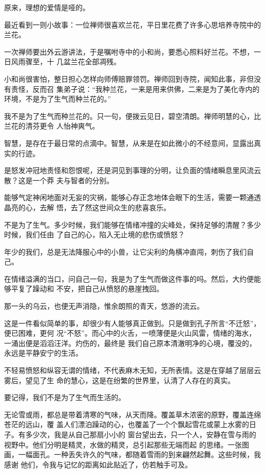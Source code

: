 		\vspace{1em}
		原来，理想的爱情是哑的。

	\endwriting



		最近看到一则小故事：一位禅师很喜欢兰花，平日里花费了许多心思培养寺院中的兰花。

		一次禅师要出外云游讲法，于是嘱咐寺中的小和尚，要悉心照料好兰花。不想，一日风雨骤至，十
	几盆兰花全部凋残。

		小和尚很害怕，整日担心怎样向师傅赔罪领罚。禅师回到寺院，闻知此事，非但没有责怪，反而召
	集弟子说：“我种兰花，一来是用来供佛，二来是为了美化寺内的环境，不是为了生气而种兰花的。”

		我不是为了生气而种兰花的。只一句，便拨云见日，碧空清朗。禅师明慧的心，比兰花的清芬更令
	人怡神爽气。

		智慧，是存在于最日常的点滴中。智慧，从来是在如此微小的不经意间，显露出真实的行迹。

		是怒发冲冠地责怪和怨恨呢，还是洞见到事理的分明，让负面的情绪瞬息里风流云散？这是一个莽
	夫与智者的分别。

		能够气定神闲地面对无妄的灾祸，能够心存正念地体会眼下的生活，需要一颗通透晶亮的心，去解
	悟，去了然这世间众生的悲喜哀乐。

		不是为了生气。多少时候，我们能够在情绪冲撞的尖峰处，保持足够的清醒？多少时候，我们任由
	了自己的心，陷入无止境的悲伤或愤怒？

		年少的我们，总是无法降服心中的小兽，让它尖利的角横冲直闯，刺伤了我们自己。

		在情绪溢满的当口，问自己一句，我是为了生气而做这件事的吗。然后，大约便能够平复了躁动和
	不安，把自己从愤怒的悬崖拽回。

		那一头的乌云，也便无声消隐，惟余朗照的青天，悠游的流云。

		这是一件看似简单的事，却很少有人能够真正做到。只是做到孔子所言“不迁怒”，便已困难，更何
	况“不怒”。而心中的火舌，一喷薄便是火山风雷，情绪的海水，一涌出便是滔滔汪洋。灼伤的，最终是
	我们自己原本清澈明净的心境，覆没的，永远是平静安宁的生活。

		不轻易愤怒和纵容无谓的情绪，不代表麻木无知，无所表情。这是在穿越了层层云雾后，望见了生
	命的慧心，这是在纷繁的世界里，认清了人存在的真实。

		要记得，我们不是为了生气而生活的。

	\endwriting



		无论雪或雨，都总是带着清寒的气味，从天而降。覆盖草木浓密的原野，覆盖连绵苍茫的远山，覆
	盖人们漂泊躁动的心，也覆盖了一个个飘起雪花或蒙上水雾的日子。有多少次，我是从自己那扇小小的
	窗台望出去，只一个人，安静在雪与雨的视野中。他们分明是精灵，水做的精灵，总引起那些无端而起
	的思绪。一张图画，一幅面孔。一种丢失许久的气味，都随着雪雨的到来翩然起舞。这些时候，我感谢
	他们，令我与记忆的距离如此贴近了，仿若触手可及。


